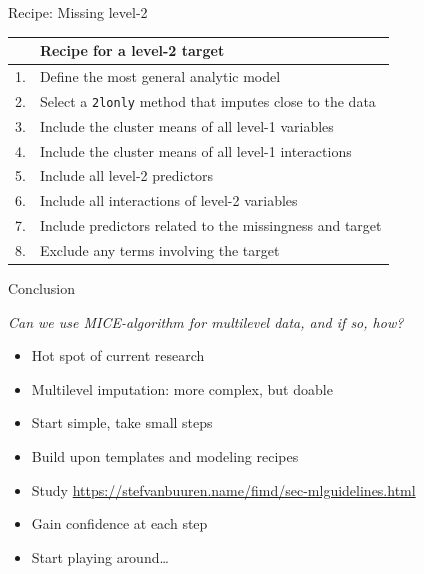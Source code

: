 \documentclass[ignorenonframetext,aspectratio=43]{beamer}
\providecommand{\tightlist}{%
  \setlength{\itemsep}{0pt}\setlength{\parskip}{0pt}}
\begin{document}
\begin{frame}[fragile]{Recipe: Missing level-2}

\begin{longtable}[]{@{}ll@{}}
\toprule
& Recipe for a level-2 target\tabularnewline
\midrule
\endhead
1. & Define the most general analytic model\tabularnewline
2. & Select a \texttt{2lonly} method that imputes close to the
data\tabularnewline
3. & Include the cluster means of all level-1 variables\tabularnewline
4. & Include the cluster means of all level-1
interactions\tabularnewline
5. & Include all level-2 predictors\tabularnewline
6. & Include all interactions of level-2 variables\tabularnewline
7. & Include predictors related to the missingness and
target\tabularnewline
8. & Exclude any terms involving the target\tabularnewline
\bottomrule
\end{longtable}

\end{frame}

\begin{frame}{Conclusion}

\emph{Can we use MICE-algorithm for multilevel data, and if so, how?}

\begin{itemize}
\tightlist
\item
  Hot spot of current research
\item
  Multilevel imputation: more complex, but doable
\item
  Start simple, take small steps
\item
  Build upon templates and modeling recipes
\item
  Study \url{https://stefvanbuuren.name/fimd/sec-mlguidelines.html}
\item
  Gain confidence at each step
\item
  Start playing around\ldots{}
\end{itemize}

\end{frame}
\end{document}
